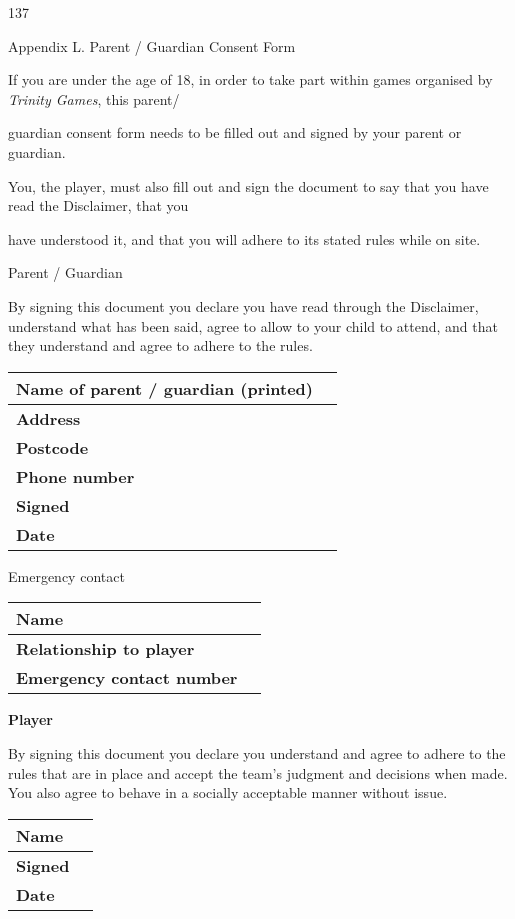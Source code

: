 \documentclass{scrbook}
\begin{document}
137

Appendix L. Parent / Guardian Consent Form

If you are under the age of 18, in order to take part within games organised by \textit{Trinity Games}, this parent/

guardian consent form needs to be filled out and signed by your parent or guardian.

You, the player, must also fill out and sign the document to say that you have read the Disclaimer, that you

have understood it, and that you will adhere to its stated rules while on site.

Parent / Guardian

By signing this document you declare you have read through the Disclaimer, understand what has been said, agree to allow to your child to attend, and that they understand and agree to adhere to the rules.

\begin{table}
\begin{tabular}{|l|l|} \hline 
\textbf{Name of parent / guardian (printed)} &  \\
 \hline \textbf{Address} &  \\
 \hline \textbf{Postcode} &  \\
 \hline \textbf{Phone number} &  \\
 \hline \textbf{Signed} &  \\
 \hline \textbf{Date} &  \\
 \hline \end{tabular}

\end{table}

Emergency contact

\begin{table}
\begin{tabular}{|l|l|} \hline 
\textbf{Name} &  \\
 \hline \textbf{Relationship to player} &  \\
 \hline \textbf{Emergency contact number} &  \\
 \hline \end{tabular}

\end{table}

\textbf{Player}

By signing this document you declare you understand and agree to adhere to the rules that are in place and accept the team's judgment and decisions when made. You also agree to behave in a socially acceptable manner without issue.

\begin{table}
\begin{tabular}{|l|l|} \hline 
\textbf{Name} &  \\
 \hline \textbf{Signed} &  \\
 \hline \textbf{Date} &  \\
 \hline \end{tabular}

\end{table}
\end{document}
